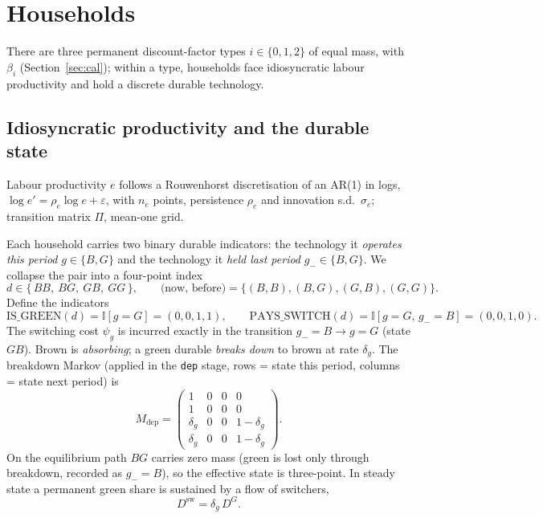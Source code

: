 \documentclass[11pt]{article}
\newcommand{\I}{\mathbb{I}}
\newcommand{\dsw}{D^{\mathrm{sw}}}
\newcommand{\DG}{D^{G}}
\begin{document}
\section{Households}\label{sec:hh}

There are three permanent discount-factor types $i\in\{0,1,2\}$ of equal mass,
with $\beta_i$ (Section~\ref{sec:cal}); within a type, households face
idiosyncratic labour productivity and hold a discrete durable technology.

\subsection{Idiosyncratic productivity and the durable state}

Labour productivity $e$ follows a Rouwenhorst discretisation of an AR(1) in
logs, $\log e' = \rho_e \log e + \varepsilon$, with $n_e$ points, persistence
$\rho_e$ and innovation s.d.\ $\sigma_e$; transition matrix $\Pi$, mean-one grid.

Each household carries two binary durable indicators: the technology it
\emph{operates this period} $g\in\{B,G\}$ and the technology it \emph{held last
period} $g_-\in\{B,G\}$. We collapse the pair into a four-point index
\begin{equation}
d\in\{\,BB,\ BG,\ GB,\ GG\,\},\qquad
\text{(now, before)}=\{(B,B),(B,G),(G,B),(G,G)\}.
\end{equation}
Define the indicators
\begin{equation}
\mathrm{IS\_GREEN}(d)=\I[g=G]=(0,0,1,1),\qquad
\mathrm{PAYS\_SWITCH}(d)=\I[g=G,\,g_-=B]=(0,0,1,0).
\end{equation}
The switching cost $\psi_g$ is incurred exactly in the transition $g_-=B\to g=G$
(state $GB$). Brown is \emph{absorbing}; a green durable \emph{breaks down} to
brown at rate $\delta_g$. The breakdown Markov (applied in the \texttt{dep}
stage, rows = state this period, columns = state next period) is
\begin{equation}
M_{\mathrm{dep}}=
\begin{pmatrix}
1 & 0 & 0 & 0\\
1 & 0 & 0 & 0\\
\delta_g & 0 & 0 & 1-\delta_g\\
\delta_g & 0 & 0 & 1-\delta_g
\end{pmatrix}.
\end{equation}
On the equilibrium path $BG$ carries zero mass (green is lost only through
breakdown, recorded as $g_-=B$), so the effective state is three-point. In
steady state a permanent green share is sustained by a flow of switchers,
\begin{equation}
\dsw=\delta_g\,\DG. \label{eq:stockflow}
\end{equation}
\end{document}
